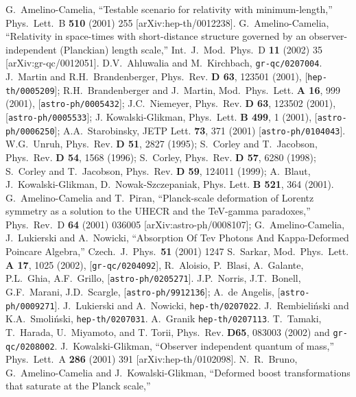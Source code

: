 \documentclass[a4paper,a4paper]{article}
\begin{document}
\begin{thebibliography}{99}

 G.~Amelino-Camelia,
``Testable scenario for relativity with minimum-length,''
Phys.\ Lett.\ B {\bf 510} (2001) 255
[arXiv:hep-th/0012238].
G.~Amelino-Camelia,
``Relativity in space-times with short-distance structure governed by an observer-independent (Planckian) length scale,''
Int.\ J.\ Mod.\ Phys.\ D {\bf 11} (2002) 35
[arXiv:gr-qc/0012051].
 D.V.~Ahluwalia and M.~Kirchbach, {\tt gr-qc/0207004}.
 J.~Martin and R.H.~Brandenberger, Phys.~Rev. {\bf D 63}, 123501 (2001), [{\tt hep-th/0005209}]; R.H.~Brandenberger and J.~Martin, Mod.~Phys.~Lett. {\bf A 16}, 999 (2001), [{\tt astro-ph/0005432}]; J.C.~Niemeyer, Phys.~Rev. {\bf D 63}, 123502 (2001), [{\tt astro-ph/0005533}]; J. Kowalski-Glikman, Phys.~Lett. {\bf B 499}, 1 (2001), [{\tt astro-ph/0006250}]; A.A.~Starobinsky, JETP Lett. {\bf 73}, 371 (2001) [{\tt astro-ph/0104043}].
 W.G.~Unruh, Phys.~Rev. {\bf D 51}, 2827 (1995); S.~Corley and T.~Jacobson, Phys.~Rev. {\bf D 54}, 1568 (1996);
S.~Corley, Phys.~Rev. {\bf D 57}, 6280 (1998);
 S.~Corley and T.~Jacobson, Phys.~Rev. {\bf D 59}, 124011 (1999); A.~Blaut, J.~Kowalski-Glikman, D.~Nowak-Szczepaniak,
    Phys. Lett. {\bf B 521}, 364 (2001).
 G.~Amelino-Camelia and T.~Piran,
``Planck-scale deformation of Lorentz symmetry as a solution to the UHECR  and the TeV-gamma paradoxes,''
Phys.\ Rev.\ D {\bf 64} (2001) 036005
[arXiv:astro-ph/0008107]; G.~Amelino-Camelia, J.~Lukierski and A.~Nowicki,
``Absorption Of Tev Photons And Kappa-Deformed Poincare Algebra,''
Czech.\ J.\ Phys.\  {\bf 51} (2001) 1247 S.~Sarkar, Mod.~Phys.~Lett. {\bf A 17}, 1025 (2002), [{\tt gr-qc/0204092}],  R.~Aloisio, P.~Blasi, A.~Galante, P.L.~Ghia, A.F.~Grillo, [{\tt astro-ph/0205271}].
 J.P.~Norris, J.T.~Bonell, G.F.~Marani, J.D.~Scargle, [{\tt astro-ph/9912136}]; A.~de Angelis, [{\tt astro-ph/0009271}].
 J.~Lukierski and A.~Nowicki, {\tt hep-th/0207022}.
 J.~Rembieli\'nski and K.A.~Smoli\'nski, {\tt hep-th/0207031}.
 A.~Granik {\tt hep-th/0207113}.
 T.~Tamaki, T.~Harada, U.~Miyamoto, and T. Torii, Phys.~Rev.  {\bf D65}, 083003 (2002) and {\tt gr-qc/0208002}.
 J.~Kowalski-Glikman,
``Observer independent quantum of mass,''
Phys.\ Lett.\ A {\bf 286} (2001) 391
[arXiv:hep-th/0102098].
 N.~R.~Bruno, G.~Amelino-Camelia and J.~Kowalski-Glikman,
``Deformed boost transformations that saturate at the Planck scale,''

\end{thebibliography}
\end{document}
